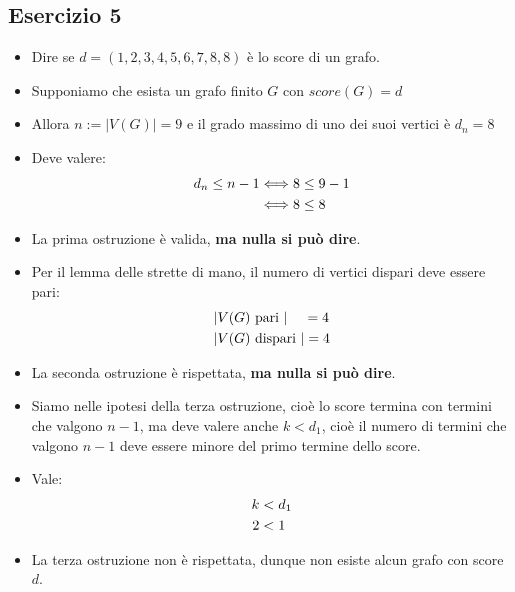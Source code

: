 \documentclass[10pt]{article}
\begin{document}
	\subsection{Esercizio 5}
	\begin{itemize}
	\item
	Dire se $d = (1,2,3,4,5,6,7,8,8)$ è lo score di un grafo.
	\item
	Supponiamo che esista un grafo finito $G$ con $score(G) = d$
	\item
	Allora $n := |V(G)| = 9$ e il grado massimo di uno dei suoi vertici è $d_n = 8$
	\item
	Deve valere:
	\begin{equation}
	\begin{split}
		d_n \leq n - 1 &\Longleftrightarrow 8 \leq 9 - 1  \\
		&\Longleftrightarrow 8 \leq 8
		\notag
		\end{split}
	\end{equation}
	\item
	La prima ostruzione è valida, \textbf{ma nulla si può dire}.
	\item
	Per il lemma delle strette di mano, il numero di vertici dispari deve essere pari:
	\begin{equation}
	\begin{split}
		|&V(G) \textrm{ pari }| \quad\, =  4\\
		|&V(G) \textrm{ dispari }| = 4 
		\notag
		\end{split}
	\end{equation}
	\item
	La seconda ostruzione è rispettata, \textbf{ma nulla si può dire}.
	\item
	Siamo nelle ipotesi della terza ostruzione, cioè lo score termina con termini che valgono $n-1$, ma deve valere anche $k < d_1$, cioè il numero di termini che valgono $n-1$ deve essere minore del primo termine dello score.
	\item
	Vale:
	\begin{equation}
	\begin{split}
		k &< d_1 \\
		2 &< 1
		\notag
		\end{split}
	\end{equation}
	\item
	La terza ostruzione non è rispettata, dunque non esiste alcun grafo con score $d$.
	\end{itemize}
	
\end{document}
